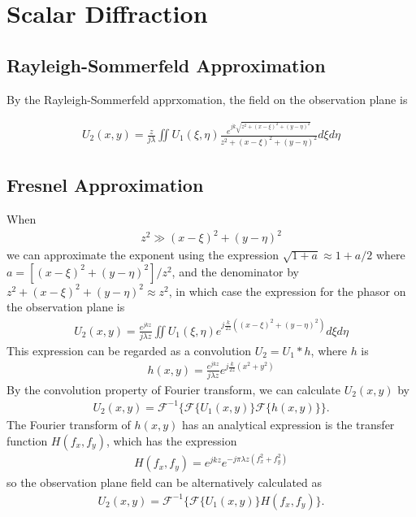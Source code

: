 \documentclass{article}
\begin{document}
\section{Scalar Diffraction}

\subsection{Rayleigh-Sommerfeld Approximation}

By the Rayleigh-Sommerfeld apprxomation, the field on the observation plane is

\begin{align}
    U_2(x, y) = \frac{z}{j\lambda} \iint U_1(\xi, \eta) \frac{e^{jk\sqrt{z^2 + (x-\xi)^2 + (y-\eta)^2}}}
    {z^2 + (x-\xi)^2 + (y-\eta)^2} d\xi d\eta
\end{align}

\subsection{Fresnel Approximation}

When
\begin{align}
    z^2 \gg (x-\xi)^2 + (y-\eta)^2
\end{align}
we can approximate the exponent using the expression $\sqrt{1 + a} \approx 1 + a/2$ where 
$a = [(x-\xi)^2 + (y-\eta)^2]/z^2$, and the denominator by $z^2 + (x-\xi)^2 + (y-\eta)^2 \approx z^2$, 
in which case the expression for the phasor on the observation plane is
\begin{align}
    U_2(x, y) = \frac{e^{jkz}}{j\lambda z} \iint U_1(\xi,\eta) e^{j\frac{k}{2z}((x-\xi)^2 + (y-\eta)^2)} d\xi d\eta
\end{align}
This expression can be regarded as a convolution $U_2 = U_1 * h$, where $h$ is
\begin{align}
    h(x, y) = \frac{e^{jkz}}{j\lambda z} e^{j\frac{k}{2z}(x^2 + y^2)}
\end{align}
By the convolution property of Fourier transform, we can calculate $U_2(x, y)$ by
\begin{align}
    \boxed{ U_2(x, y) = \mathcal{F}^{-1}\{ \mathcal{F}\{U_1(x, y)\} \mathcal{F}\{h(x, y)\} \}. }
\end{align}
The Fourier transform of $h(x, y)$ has an analytical expression is the transfer function $H(f_x, f_y)$,
which has the expression
\begin{align}
    H(f_x, f_y) = e^{jkz} e^{-j\pi\lambda z(f_x^2 + f_y^2)}
\end{align}
so the observation plane field can be alternatively calculated as
\begin{align}
    \boxed{ U_2(x, y) = \mathcal{F}^{-1}\{ \mathcal{F}\{U_1(x, y)\} H(f_x, f_y) \}. }
\end{align}
\end{document}
